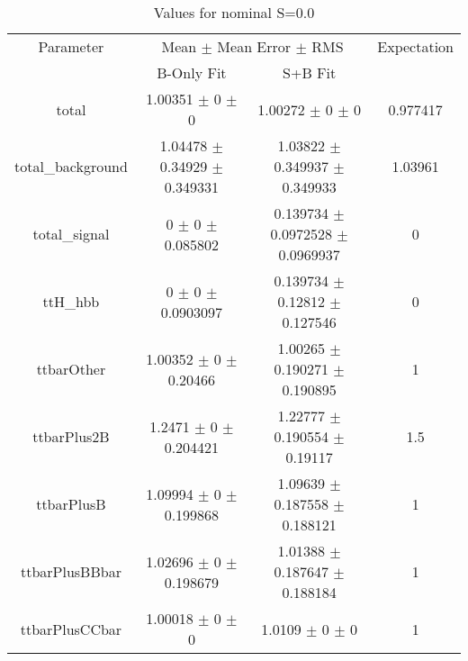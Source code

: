 \begin{table}
\centering
\caption{Values for nominal S=0.0}
\begin{tabular}{cccc}
\toprule
Parameter & \multicolumn{2}{c}{Mean $\pm$ Mean Error $\pm$ RMS} & Expectation\\
 & B-Only Fit & S+B Fit & \\
\midrule
total & \num{1.00351} $\pm$ \num{0} $\pm$ \num{0} & \num{1.00272} $\pm$ \num{0} $\pm$ \num{0} & \num{0.977417}\\
total\_background & \num{1.04478} $\pm$ \num{0.34929} $\pm$ \num{0.349331} & \num{1.03822} $\pm$ \num{0.349937} $\pm$ \num{0.349933} & \num{1.03961}\\
total\_signal & \num{0} $\pm$ \num{0} $\pm$ \num{0.085802} & \num{0.139734} $\pm$ \num{0.0972528} $\pm$ \num{0.0969937} & \num{0}\\
ttH\_hbb & \num{0} $\pm$ \num{0} $\pm$ \num{0.0903097} & \num{0.139734} $\pm$ \num{0.12812} $\pm$ \num{0.127546} & \num{0}\\
ttbarOther & \num{1.00352} $\pm$ \num{0} $\pm$ \num{0.20466} & \num{1.00265} $\pm$ \num{0.190271} $\pm$ \num{0.190895} & \num{1}\\
ttbarPlus2B & \num{1.2471} $\pm$ \num{0} $\pm$ \num{0.204421} & \num{1.22777} $\pm$ \num{0.190554} $\pm$ \num{0.19117} & \num{1.5}\\
ttbarPlusB & \num{1.09994} $\pm$ \num{0} $\pm$ \num{0.199868} & \num{1.09639} $\pm$ \num{0.187558} $\pm$ \num{0.188121} & \num{1}\\
ttbarPlusBBbar & \num{1.02696} $\pm$ \num{0} $\pm$ \num{0.198679} & \num{1.01388} $\pm$ \num{0.187647} $\pm$ \num{0.188184} & \num{1}\\
ttbarPlusCCbar & \num{1.00018} $\pm$ \num{0} $\pm$ \num{0} & \num{1.0109} $\pm$ \num{0} $\pm$ \num{0} & \num{1}\\
\bottomrule
\end{tabular}
\end{table}